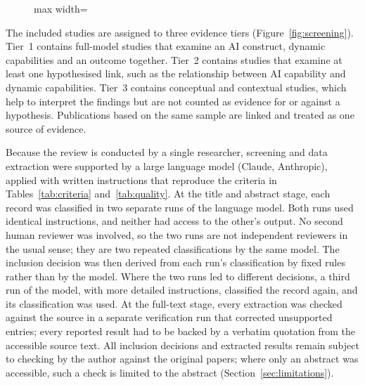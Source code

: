 \begin{figure}[htbp]
\begin{adjustbox}{max width=\textwidth}
\end{adjustbox}
\end{figure}

The included studies are assigned to three evidence tiers (Figure~\ref{fig:screening}). Tier~1 contains full-model studies that examine an AI construct, dynamic capabilities and an outcome together. Tier~2 contains studies that examine at least one hypothesised link, such as the relationship between AI capability and dynamic capabilities. Tier~3 contains conceptual and contextual studies, which help to interpret the findings but are not counted as evidence for or against a hypothesis. Publications based on the same sample are linked and treated as one source of evidence.

Because the review is conducted by a single researcher, screening and data extraction were supported by a large language model (Claude, Anthropic), applied with written instructions that reproduce the criteria in Tables~\ref{tab:criteria} and~\ref{tab:quality}. At the title and abstract stage, each record was classified in two separate runs of the language model. Both runs used identical instructions, and neither had access to the other's output. No second human reviewer was involved, so the two runs are not independent reviewers in the usual sense; they are two repeated classifications by the same model. The inclusion decision was then derived from each run's classification by fixed rules rather than by the model. Where the two runs led to different decisions, a third run of the model, with more detailed instructions, classified the record again, and its classification was used. At the full-text stage, every extraction was checked against the source in a separate verification run that corrected unsupported entries; every reported result had to be backed by a verbatim quotation from the accessible source text. All inclusion decisions and extracted results remain subject to checking by the author against the original papers; where only an abstract was accessible, such a check is limited to the abstract (Section~\ref{sec:limitations}).


